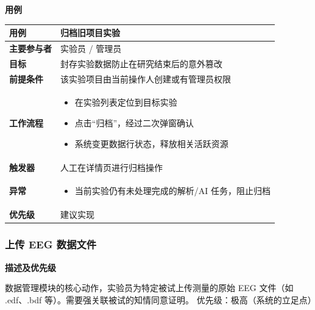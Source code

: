 \textbf{用例}
\begin{table}[H]
    \centering
    \begin{tabular}{|p{3cm}|p{11.5cm}|}
        \hline
        \textbf{用例} & 归档旧项目实验 \\
        \hline
        \textbf{主要参与者} & 实验员 / 管理员 \\
        \hline
        \textbf{目标} & 封存实验数据防止在研究结束后的意外篡改 \\
        \hline
        \textbf{前提条件} & 该实验项目由当前操作人创建或有管理员权限 \\
        \hline
        \textbf{工作流程} & 
        \vspace{-0.3cm}
        \begin{itemize}
            \item 在实验列表定位到目标实验
            \item 点击“归档”，经过二次弹窗确认
            \item 系统变更数据行状态，释放相关活跃资源
        \end{itemize} \vspace{-0.3cm} \\
        \hline
        \textbf{触发器} & 人工在详情页进行归档操作 \\
        \hline
        \textbf{异常} &
        \vspace{-0.3cm}
        \begin{itemize}
            \item 当前实验仍有未处理完成的解析/AI 任务，阻止归档
        \end{itemize} \vspace{-0.3cm} \\
        \hline
        \textbf{优先级} & 建议实现 \\
        \hline
    \end{tabular}
\end{table}

\subsubsection{上传 EEG 数据文件}

\textbf{描述及优先级}

数据管理模块的核心动作，实验员为特定被试上传测量的原始 EEG 文件（如 .edf、.bdf 等）。需要强关联被试的知情同意证明。
优先级：极高（系统的立足点）

